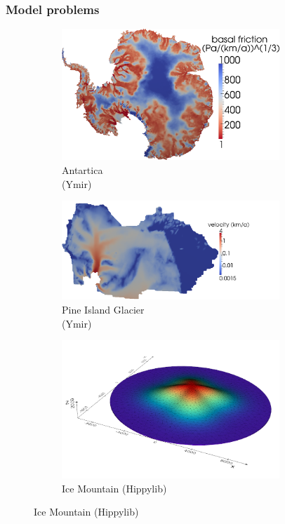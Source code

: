 \documentclass[10pt,final,xcolor=dvipsnames]{beamer}
\begin{document}
\begin{frame}
	\frametitle{Model problems}
	\begin{figure}
		\centering
		\begin{subfigure}[b]{0.49\textwidth}
			\centering
			\includegraphics[width=0.9\textwidth]{beta_cube_cut.png}
			\caption{Antartica\\(Ymir)}
		\end{subfigure}
		\hfill
		\begin{subfigure}[b]{0.49\textwidth}
			\centering
			\includegraphics[width=0.9\textwidth]{pig_uobs_uqice.png}
			\caption{Pine Island Glacier\\(Ymir)}
		\end{subfigure}
		\hfill
		\begin{subfigure}[b]{0.49\textwidth}
			\centering
			\includegraphics[width=0.9\textwidth]{Mesh_Height.png}
			\caption{Ice Mountain (Hippylib)}
		\end{subfigure}
	\end{figure}
\end{frame}
\end{document}
